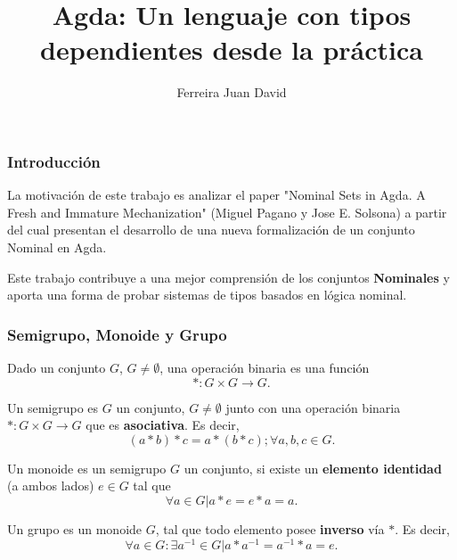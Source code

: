 \documentclass[11pt,spanish]{beamer}
\theoremstyle{mystyle}
\begin{document}
	\author{Ferreira Juan David}
	\title{Agda: Un lenguaje con tipos dependientes desde la práctica}
	\begin{frame}[plain]
		\maketitle
	\end{frame}
	
	\begin{frame}
		\frametitle{Introducción}
		La motivación de este trabajo es analizar el paper 
		"Nominal Sets in Agda. A Fresh and Immature Mechanization" (Miguel Pagano y Jose E. Solsona)
		a partir del cual presentan el desarrollo de una nueva formalización 
		de un conjunto Nominal en Agda.
		
		Este trabajo contribuye a una mejor comprensión de los conjuntos \textbf{Nominales} y 
		aporta una forma de
		probar sistemas de tipos basados en lógica nominal.
	\end{frame}

    \begin{frame}
    	\frametitle{Semigrupo, Monoide y Grupo}
    		Dado un conjunto $G$, $G\not = \emptyset$, una operación binaria
    		es una función $$\ast : G \times G \to G.$$
    	
    	    Un semigrupo es $G$ un conjunto, $G\not = \emptyset$ junto con una operación 
    	    binaria $\ast : G \times G \to G$ que es \textbf{asociativa}. Es decir,
    	    $$(a \ast b) \ast c = a \ast (b \ast c); \forall a, b, c \in G.$$
        
    		Un monoide es un semigrupo $G$ un conjunto, si existe un \textbf{elemento identidad}
    		(a ambos lados) $e \in G$ tal que $$\forall a \in G | a \ast e = e \ast a = a.$$
    	
    	    Un grupo es un monoide $G$, tal que todo elemento posee \textbf{inverso} vía $\ast$.
    	    Es decir, $$\forall a \in G : \exists a^{-1} \in G | a \ast a^{-1} = a^{-1} \ast a = e.$$
	\end{frame}
\end{document}
